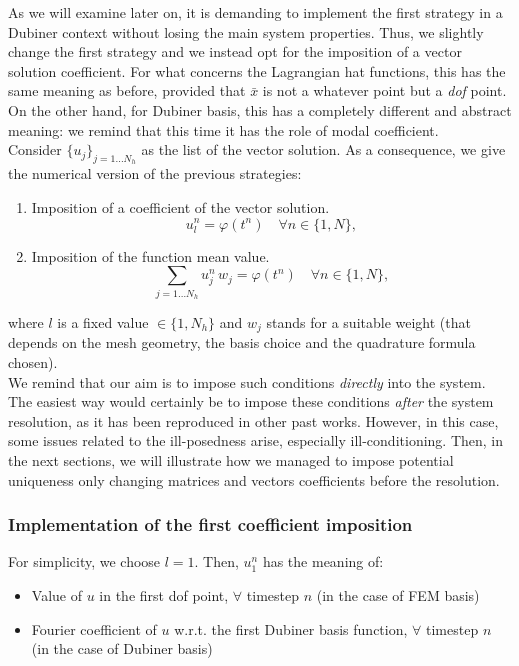 \documentclass[a4paper,11pt]{article}
\begin{document}
\noindent As we will examine later on, it is demanding to implement the first strategy in a Dubiner context without losing the main system properties. Thus, we slightly change the first strategy and we instead opt for the imposition of a vector solution coefficient. For what concerns the Lagrangian hat functions, this has the same meaning as before, provided that $\bar{x}$ is not a whatever point but a \emph{dof} point. On the other hand, for Dubiner basis, this has a completely different and abstract meaning: we remind that this time it has the role of modal coefficient. \\

\noindent Consider $\{u_j\}_{j=1 \dots N_h}$ as the list of the vector solution. As a consequence, we give the numerical version of the previous strategies:
\begin{enumerate}
	\item Imposition of a coefficient of the vector solution.
	\begin{equation*}
	u_l^n = \varphi(t^n) \quad \forall n \in \{1,N\},
	\end{equation*}
	\item Imposition of the function mean value.
	\begin{equation*}
	\sum_{j=1\dots N_h} u_j^n \, w_j = \varphi(t^n)\quad \forall n \in \{1,N\},
	\end{equation*}
\end{enumerate}	
where $l$ is a fixed value $\in \{1,N_h\}$ and $w_j$ stands for a suitable weight (that depends on the mesh geometry, the basis choice and the quadrature formula chosen). \\

\noindent We remind that our aim is to impose such conditions \emph{directly} into the system. The easiest way would certainly be to impose these conditions \emph{after} the system resolution, as it has been reproduced in other past works. However, in this case, some issues related to the ill-posedness arise, especially ill-conditioning. Then, in the next sections, we will illustrate how we managed to impose potential uniqueness only changing matrices and vectors coefficients before the resolution.

\subsubsection{Implementation of the first coefficient imposition} \label{first_coeff_implementation}
For simplicity, we choose $l=1$. Then, $u_1^n$ has the meaning of:
\begin{itemize}
	\item Value of $u$ in the first dof point, $\forall$ timestep $n$ (in the case of FEM basis)
	\item Fourier coefficient of $u$ w.r.t. the first Dubiner basis function, $\forall$ timestep $n$ (in the case of Dubiner basis)
\end{itemize}
\end{document}
